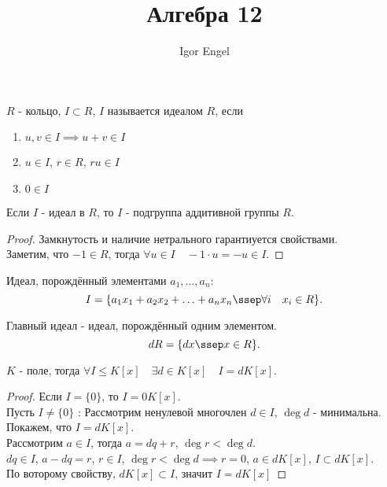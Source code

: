 \documentclass[11pt, oneside]{article}   	%
\title{Алгебра 12}
\author{Igor Engel}
\date{}
\begin{document}
\maketitle
\section{}
   \begin{definition}
       $R$ - кольцо, $I \subset R$, $I$ называется идеалом $R$, если
       \begin{enumerate}
           \item $u, v\in I \implies u+v\in I$
           \item $u\in I$, $r\in R$, $ru\in I$
           \item $0\in I$
       \end{enumerate}
   \end{definition}
   \begin{dlemma}
       Если $I$ - идеал в $R$, то $I$ - подгруппа аддитивной группы $R$.
       \begin{proof}
          Замкнутость и наличие нетрального гарантиуется свойствами.\\
          Заметим, что $-1\in R$, тогда $\forall{u\in I}\quad -1\cdot u = -u\in I$.
       \end{proof}
   \end{dlemma}
   \begin{definition}
       Идеал, порождённый элементами $a_1, \ldots, a_n$:
       \[ I = \{a_1x_1+a_2x_2 + \ldots + a_nx_n \ssep \forall{i}\quad x_i\in R\}  .\] 
   \end{definition}
   \begin{definition}
       Главный идеал - идеал, порождённый одним элементом.
       \[ dR = \{dx\ssep x\in R\}  .\] 
   \end{definition}
   \begin{theorem}
       $K$ - поле, тогда $\forall{I \le K[x]}\quad \exists{d\in K[x]}\quad I = dK[x]$.
       \begin{proof}
           Если  $I = \{0\} $, то $I = 0K[x]$.\\
           Пусть $I \neq \{0\} $ :
           Рассмотрим ненулевой многочлен $d\in I$, $\deg d$ - минимальна.\\
           Покажем, что $I = dK[x]$.\\
           Рассмотрим $a\in I$, тогда $a = dq+r$, $\deg r < \deg d$.\\
           $dq\in I$,  $a-dq=r$,  $r\in I$, $\deg r < \deg d \implies r = 0$, $a\in dK[x]$, $I \subset dK[x]$.\\
           По воторому свойству, $dK[x] \subset  I$, значит $I = dK[x]$
       \end{proof}
   \end{theorem}
\end{document}
